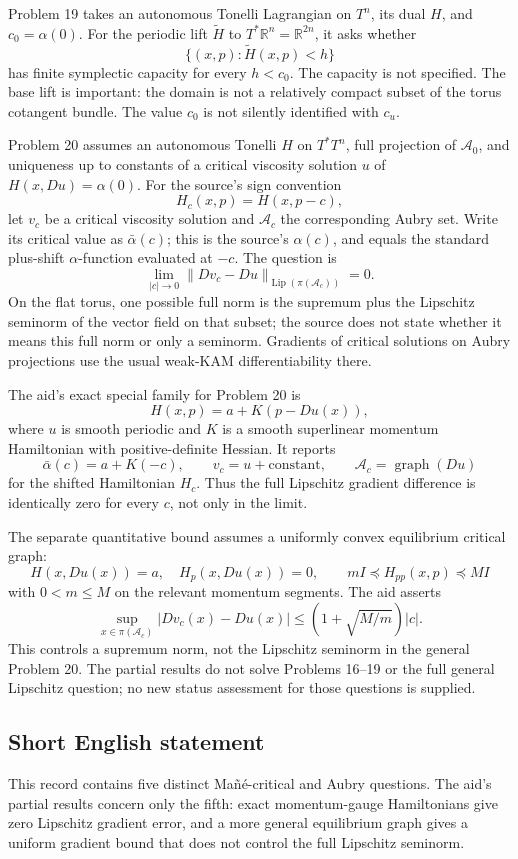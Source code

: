 \documentclass[11pt]{article}
\newcommand{\R}{\mathbb{R}}
\begin{document}
Problem 19 takes an autonomous Tonelli Lagrangian on \(T^n\), its dual \(H\), and \(c_0=\alpha(0)\). For the periodic lift \(\widetilde H\) to \(T^*\R^n=\R^{2n}\), it asks whether
\[
 \{(x,p):\widetilde H(x,p)<h\}
\]
has finite symplectic capacity for every \(h<c_0\). The capacity is not specified. The base lift is important: the domain is not a relatively compact subset of the torus cotangent bundle. The value \(c_0\) is not silently identified with \(c_u\).

Problem 20 assumes an autonomous Tonelli \(H\) on \(T^*T^n\), full projection of \(\mathcal A_0\), and uniqueness up to constants of a critical viscosity solution \(u\) of \(H(x,Du)=\alpha(0)\). For the source's sign convention
\[
 H_c(x,p)=H(x,p-c),
\]
let \(v_c\) be a critical viscosity solution and \(\mathcal A_c\) the corresponding Aubry set. Write its critical value as \(\bar\alpha(c)\); this is the source's \(\alpha(c)\), and equals the standard plus-shift \(\alpha\)-function evaluated at \(-c\). The question is
\[
 \lim_{|c|\to0}\|Dv_c-Du\|_{\operatorname{Lip}(\pi(\mathcal A_c))}=0.
\]
On the flat torus, one possible full norm is the supremum plus the Lipschitz seminorm of the vector field on that subset; the source does not state whether it means this full norm or only a seminorm. Gradients of critical solutions on Aubry projections use the usual weak-KAM differentiability there.

The aid's exact special family for Problem 20 is
\[
 H(x,p)=a+K(p-Du(x)),
\]
where \(u\) is smooth periodic and \(K\) is a smooth superlinear momentum Hamiltonian with positive-definite Hessian. It reports
\[
 \bar\alpha(c)=a+K(-c),\qquad v_c=u+\text{constant},\qquad
 \mathcal A_c=\operatorname{graph}(Du)
\]
for the shifted Hamiltonian \(H_c\). Thus the full Lipschitz gradient difference is identically zero for every \(c\), not only in the limit.

The separate quantitative bound assumes a uniformly convex equilibrium critical graph:
\[
 H(x,Du(x))=a,\quad H_p(x,Du(x))=0,\qquad
 mI\preceq H_{pp}(x,p)\preceq MI
\]
with \(0<m\le M\) on the relevant momentum segments. The aid asserts
\[
 \sup_{x\in\pi(\mathcal A_c)}|Dv_c(x)-Du(x)|
 \le(1+\sqrt{M/m})|c|.
\]
This controls a supremum norm, not the Lipschitz seminorm in the general Problem 20. The partial results do not solve Problems 16--19 or the full general Lipschitz question; no new status assessment for those questions is supplied.
\subsection{Short English statement}
This record contains five distinct Ma\~n\'e-critical and Aubry questions. The aid's partial results concern only the fifth: exact momentum-gauge Hamiltonians give zero Lipschitz gradient error, and a more general equilibrium graph gives a uniform gradient bound that does not control the full Lipschitz seminorm.
\end{document}

